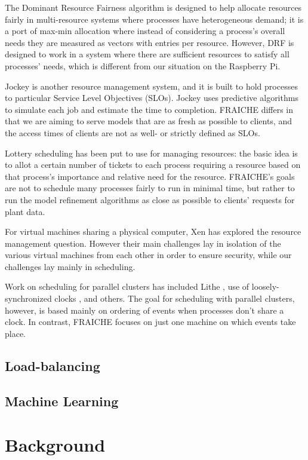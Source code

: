 \documentclass[a4paper]{acm_proc_article-sp}
\begin{document}
The Dominant Resource Fairness algorithm \cite{} is designed to help allocate resources fairly in multi-resource systems where processes have heterogeneous demand; it is a port of max-min allocation \cite{} where instead of considering a process's overall needs they are measured as vectors with entries per resource.  However, DRF is designed to work in a system where there are sufficient resources to satisfy all processes' needs, which is different from our situation on the Raspberry Pi.

Jockey \cite{} is another resource management system, and it is built to hold processes to particular Service Level Objectives (SLOs).  Jockey uses predictive algorithms to simulate each job and estimate the time to completion.  FRAICHE differs in that we are aiming to serve models that are as fresh as possible to clients, and the access times of clients are not as well- or strictly defined as SLOs.

Lottery scheduling has been put to use for managing resources: the basic idea is to allot a certain number of tickets to each process requiring a resource based on that process's importance and relative need for the resource.  FRAICHE's goals are not to schedule many processes fairly to run in minimal time, but rather to run the model refinement algorithms as close as possible to clients' requests for plant data.

For virtual machines sharing a physical computer, Xen has explored the resource management question.  However their main challenges lay in isolation of the various virtual machines from each other in order to ensure security, while our challenges lay mainly in scheduling.

Work on scheduling for parallel clusters has included Lithe \cite{}, use of loosely-synchronized clocks \cite{}, and others.  The goal for scheduling with parallel clusters, however, is based mainly on ordering of events when processes don't share a clock.  In contrast, FRAICHE focuses on just one machine on which events take place.

\subsection{Load-balancing}

\subsection{Machine Learning}

\section{Background}
\end{document}
